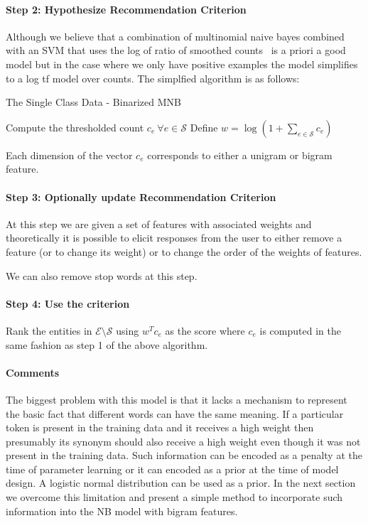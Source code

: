 \documentclass{article}
\begin{document}
\paragraph{Step 2: Hypothesize Recommendation Criterion}
Although we believe that a combination of multinomial naive bayes combined with
an SVM that uses the log of ratio of smoothed
counts~\cite{wang2012baselines} is a priori a good model but in the
case where we only have positive examples the model simplifies to a log tf model
over counts. The simplfied algorithm is as follows:
\begin{algorithm}
  \caption{The Single Class Data - Binarized MNB}\label{alg:mnb-svm}
  \begin{algorithmic}[1]
    \State Compute the thresholded count $c_e\ \forall e \in \mathcal{S}$
    \State Define $w = \log \left(1 + {\sum_{e \in \mathcal{S}}c_e}\right)$
  \end{algorithmic}
\end{algorithm}
Each dimension of the vector $c_e$ corresponds to either a unigram or bigram
feature.

\paragraph{Step 3: Optionally update Recommendation Criterion}
At this step we are given a set of features with associated weights and
theoretically it is possible to elicit responses from the user to either
remove a feature (or to change its weight)  or to change the order of the
weights of features.

We can also remove stop words at this step.
\paragraph{Step 4: Use the criterion}
Rank the entities in $\mathcal{E}\setminus \mathcal{S}$ using $w^Tc_e$ as the
score where $c_e$ is computed in the same fashion as step 1 of the above algorithm.

\paragraph{Comments} The biggest problem with this model is that it lacks a mechanism
to represent the basic fact that different words can have the same meaning. If a
particular token is present in the training data and it receives a high weight
then presumably its synonym should also receive a high weight even though it was
not present in the training data. Such information can be encoded as a penalty
at the time of parameter learning or it can encoded as a prior at the time of
model design. A logistic normal distribution can be used as a
prior. In the next section we overcome this limitation and present a simple
method to incorporate such information into the NB model with bigram features.
\end{document}
